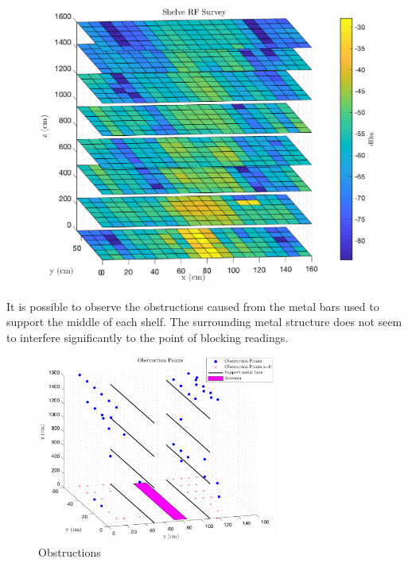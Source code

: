\begin{figure}
    \centering
    \includegraphics[width=0.7\linewidth]{./figs/tests/rfsurvey.eps}
    \caption{}
    \label{fig:rfsurvey}
\end{figure}


It is possible to observe the obstructions caused from the metal bars used to support the middle of each shelf. The surrounding metal structure does not seem to interfere significantly to the point of blocking readings.

\begin{figure}
    \centering
    \includegraphics[width=0.7\textwidth]{figs/tests/obstructions.eps}
    \caption{Obstructions}
    \label{fig:shelveobstructions}
\end{figure}


